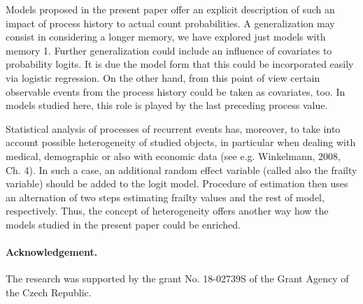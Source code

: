\documentclass[11pt]{article}
\begin{document}
Models proposed in the present paper offer an explicit description
of such an impact of process history to actual count
probabilities. A generalization may consist in considering a
longer memory, we have explored just models with memory 1.
Further generalization could include an influence of covariates to
probability logits. It is due the model form that this could be
incorporated easily via logistic regression. On the other hand, from this point of view
certain observable events from the process history could be taken as covariates, too.
In models studied here, this role is played by the last preceding process value.

Statistical analysis of processes of recurrent events has,
moreover, to take into account possible heterogeneity of studied
objects, in particular when dealing with medical, demographic or
also with economic data (see e.g. Winkelmann, 2008, Ch. 4). In such
a case, an additional random effect variable (called also the
frailty variable) should be added to the logit model. Procedure of
estimation then uses an alternation of two steps estimating
frailty values and the rest of model, respectively. Thus, the concept of heterogeneity
offers another way how the models studied in the present paper could be enriched.

\paragraph{Acknowledgement.}
The research was supported by the grant No. 18-02739S of the Grant
Agency of the Czech Republic.
\end{document}

